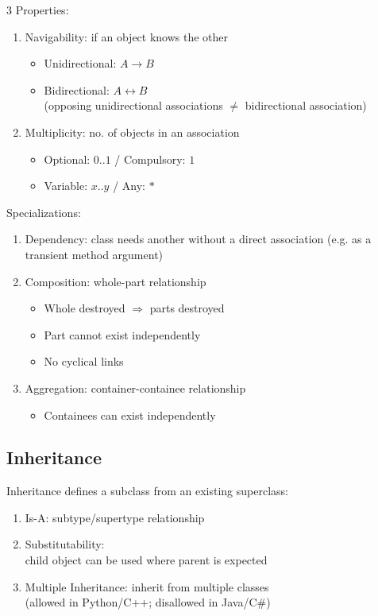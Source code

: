 \documentclass[12pt, a4paper]{article}
\begin{document}
\begin{multicols*}{3}
Properties:
\begin{enumerate}[\roman*.]
  \item Navigability: if an object knows the other 
    \begin{itemize}[leftmargin=*]\vspace{3pt}
      \item Unidirectional: $A\rightarrow B$
      \item Bidirectional: $A\leftrightarrow B$\\(opposing unidirectional associations $\neq$ bidirectional association)
    \end{itemize}
  \item Multiplicity: no. of objects in an association
    \begin{itemize}[leftmargin=*]\vspace{3pt}
      \item Optional: $0..1$ / Compulsory: $1$
      \item Variable: $x..y$ / Any: $*$ 
    \end{itemize}
\end{enumerate}

Specializations:
\begin{enumerate}[\roman*.]
  \item Dependency: class needs another without a direct association (e.g. as a transient method argument)
  \item Composition: whole-part relationship
    \begin{itemize}[leftmargin=*]\vspace{3pt}
      \item Whole destroyed $\Rightarrow$ parts destroyed
      \item Part cannot exist independently 
      \item No cyclical links
    \end{itemize}
  \item Aggregation: container-containee relationship 
    \begin{itemize}[leftmargin=*]\vspace{3pt}
      \item Containees can exist independently
    \end{itemize}
\end{enumerate}
\colbreak
\subsection{Inheritance}
Inheritance defines a subclass from an existing superclass:
\begin{enumerate}[\roman*.]
  \item Is-A: subtype/supertype relationship
  \item Substitutability:\\child object can be used where parent is expected 
  \item Multiple Inheritance: inherit from multiple classes\\
  (allowed in Python/C++; disallowed in Java/C\#)
\end{enumerate}


\end{multicols*}
\end{document}
